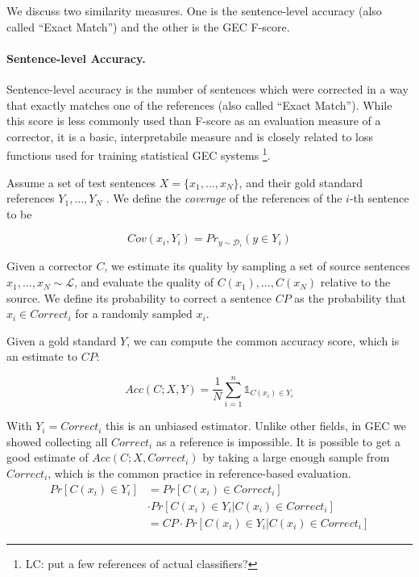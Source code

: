 \documentclass[english]{article}
\newcommand{\lc}[1]{\footnote{\color{green}LC: #1}}
\begin{document}
We discuss two similarity measures. One is the sentence-level accuracy (also called ``Exact Match'') and the other is the GEC F-score.

 
\paragraph{Sentence-level Accuracy.}
Sentence-level accuracy is the number of sentences which were corrected in a way that exactly matches one of the
references (also called ``Exact Match''). While this score is less commonly used than F-score as an evaluation
measure of a corrector, it is a basic, interpretabile measure and is closely related to loss functions used for
training statistical GEC systems \cite{rozovskaya2010training,chodorow2012problems}\lc{put a few references of actual classifiers?}. 


Assume a set of test sentences $X=\{x_1,\ldots,x_N\}$,
and their gold standard references $Y_1,\ldots,Y_N$ . We define the
{\it coverage} of the references of the $i$-th sentence to be

\begin{equation}
  Cov(x_i,Y_i)=Pr_{y \sim \mathcal{D}_i}(y \in Y_i)
\end{equation}

Given a corrector $C$, we estimate its quality by sampling a set of source sentences
$x_1,\ldots,x_N \sim \mathcal{L}$, and evaluate the quality of $C(x_1),\ldots,C(x_N)$ relative
to the source. We define its probability to correct a sentence $CP$
as the probability that $x_i \in Correct_i$ for a randomly sampled $x_i$.

Given a gold standard $Y$,  we can compute the common accuracy score, which is an estimate to $CP$:

\begin{equation}
  Acc(C;X,Y) = \frac{1}{N} \sum_{i=1}^n \mathds{1}_{C(x_i) \in Y_i}
\end{equation}

With $Y_i=Correct_i$ this is an unbiased estimator. Unlike other fields, in GEC we showed collecting all $Correct_i$ as a reference is impossible. It is possible to get a good estimate of $Acc(C;X,Correct_i)$
by taking a large enough sample from $Correct_i$, which is the common practice in reference-based evaluation.
\begin{align}\label{eq:correction-in-gs}
Pr[C(x_i) \in Y_i] &= 
Pr[C(x_i) \in Correct_i]\\\nonumber&
 \cdot Pr[C(x_i) \in Y_i | C(x_i) \in Correct_i]\\
&= CP\cdot Pr[C(x_i) \in Y_i | C(x_i) \in Correct_i]\nonumber
\end{align}
\end{document}
